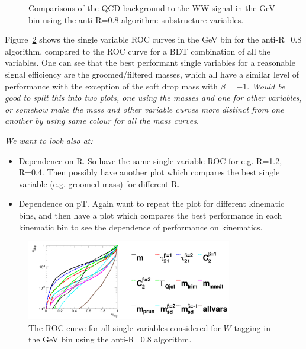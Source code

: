 \begin{figure}
\begin{center}
\caption{Comparisons of the QCD background to the WW signal in the  GeV bin using the anti-\kT R=0.8 algorithm:
  substructure variables.}
\label{fig:pt500_subst_AKt_R08}
\end{center}
\end{figure}


Figure~\ref{fig:pt500_single_AKt_R08} shows the single variable ROC curves in
the  GeV bin for the anti-\kT R=0.8 algorithm, compared to the
ROC curve for a BDT combination of all the variables. One can see that
the best performant single variables for a reasonable signal
efficiency are the groomed/filtered masses, which all have a similar
level of performance with the exception of the soft drop mass with $\beta=-1$. {\it Would be good to split this into two plots, one
using the masses and one for other variables, or somehow make the mass
and other variable curves more distinct from one another by using same
colour for all the mass curves}.

{\it We want to look also at:
\begin{itemize}
\item Dependence on R. So have the same single variable ROC for
e.g. R=1.2, R=0.4. Then possibly have another plot which compares the
best single variable (e.g. groomed mass) for
different R.
\item Dependence on pT. Again want to repeat the plot for different
kinematic bins, and then have a plot which compares the best
performance in each kinematic bin to see the dependence of performance
on kinematics.
\end{itemize}
}

\begin{figure}
\begin{center}
\includegraphics[width=0.8\textwidth]{./Figures/WTagging/pT500/AKtR08/Rocs_1D_single.png}
\caption{The ROC curve for all single variables considered for $W$
tagging in the  GeV bin using the anti-\kT R=0.8 algorithm.}
\label{fig:pt500_single_AKt_R08}
\end{center}
\end{figure}

